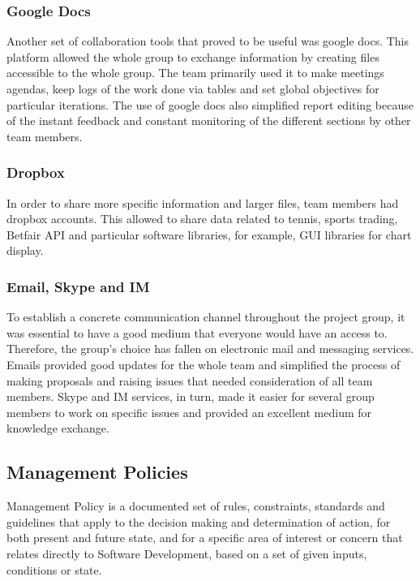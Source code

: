 \documentclass[10pt]{article}
\begin{document}
\subsubsection{Google Docs}

Another set of collaboration tools that proved to be useful was google docs. This platform allowed the whole group to exchange information by creating files accessible to the whole group. The team primarily used it to make meetings agendas, keep logs of the work done via tables and set global objectives for particular iterations. The use of google docs also simplified report editing because of the instant feedback and constant monitoring of the different sections by other team members.

\subsubsection{Dropbox}

In order to share more specific information and larger files, team members had dropbox accounts. This allowed to share data related to tennis, sports trading, Betfair API and particular software libraries, for example, GUI libraries for chart display.

\subsubsection{Email, Skype and IM}

To establish a concrete communication channel throughout the project group, it was essential to have a good medium that everyone would have an access to. Therefore, the group's choice has fallen on electronic mail and messaging services. Emails provided good updates for the whole team and simplified the process of making proposals and raising issues that needed consideration of all team members. Skype and IM services, in turn, made it easier for several group members to work on specific issues and provided an excellent medium for knowledge exchange.

\subsection{Management Policies}

Management Policy is a documented set of rules, constraints, standards and guidelines that apply to the decision making and determination of action, for both present and future state, and for a specific area of interest or concern that relates directly to Software Development, based on a set of given inputs, conditions or state.
\end{document}

